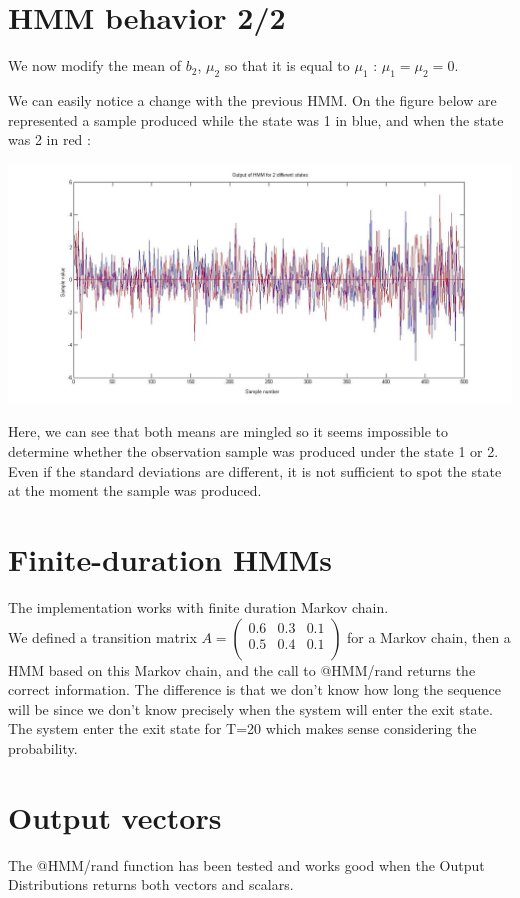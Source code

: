 \documentclass[a4paper]{report}
\begin{document}
\section{HMM behavior 2/2}
We now modify the mean of $b_{2}$, $\mu_{2}$ so that it is equal to $\mu_{1}$ : $\mu_{1}=\mu_{2}=0$. 

We can easily notice a change with the previous HMM. On the figure below are represented a sample produced while the state was 1 in blue, and when the state was 2 in red :

\includegraphics[width=15cm]{Question_5_mean_bis.jpg}

Here, we can see that both means are mingled so it seems impossible to determine whether the observation sample was produced under the state 1 or 2. Even if the standard deviations are different, it is not sufficient to spot the state at the moment the sample was produced. 

\section{Finite-duration HMMs}
The implementation works with finite duration Markov chain.\\
We defined a transition matrix $A = \begin{pmatrix}
  0.6 & 0.3 & 0.1\\
  0.5 & 0.4 & 0.1\\
\end{pmatrix}$ for a Markov chain, then a HMM based on this Markov chain, and the call to @HMM/rand returns the correct information. The difference is that we don't know how long the sequence will be since we don't know precisely when the system will enter the exit state. The system enter the exit state for T=20 which makes sense considering the probability.

\section{Output vectors}
The @HMM/rand function has been tested and works good when the Output Distributions returns both vectors and scalars.
\end{document}
